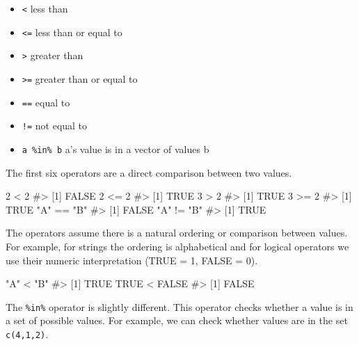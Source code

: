 \documentclass[
  letterpaper,
]{latex/krantz}
\makeatletter
\newenvironment{Shaded}{\begin{snugshade}}{\end{snugshade}}
\newcommand{\CommentTok}[1]{\textcolor[rgb]{0.37,0.37,0.37}{#1}}
\newcommand{\ConstantTok}[1]{\textcolor[rgb]{0.56,0.35,0.01}{#1}}
\newcommand{\DecValTok}[1]{\textcolor[rgb]{0.68,0.00,0.00}{#1}}
\newcommand{\SpecialCharTok}[1]{\textcolor[rgb]{0.37,0.37,0.37}{#1}}
\newcommand{\StringTok}[1]{\textcolor[rgb]{0.13,0.47,0.30}{#1}}
\providecommand{\tightlist}{%
  \setlength{\itemsep}{0pt}\setlength{\parskip}{0pt}}\usepackage{longtable,booktabs,array}
\newenvironment{kframe}{%
\medskip{}
\setlength{\fboxsep}{.8em}
 \def\at@end@of@kframe{}%
 \ifinner\ifhmode%
  \def\at@end@of@kframe{\end{minipage}}%
  \begin{minipage}{\columnwidth}%
 \fi\fi%
 \def\FrameCommand##1{\hskip\@totalleftmargin \hskip-\fboxsep
 \colorbox{shadecolor}{##1}\hskip-\fboxsep
     \hskip-\linewidth \hskip-\@totalleftmargin \hskip\columnwidth}%
 \MakeFramed {\advance\hsize-\width
   \@totalleftmargin\z@ \linewidth\hsize
   \@setminipage}}%
 {\par\unskip\endMakeFramed%
 \at@end@of@kframe}
\renewenvironment{Shaded}{\begin{kframe}}{\end{kframe}}
\makeatother
\begin{document}
\begin{itemize}
\tightlist
\item
  \texttt{\textless{}} less than
\item
  \texttt{\textless{}=} less than or equal to
\item
  \texttt{\textgreater{}} greater than
\item
  \texttt{\textgreater{}=} greater than or equal to
\item
  \texttt{==} equal to
\item
  \texttt{!=} not equal to
\item
  \texttt{a\ \%in\%\ b} a's value is in a vector of values b
\end{itemize}

The first six operators are a direct comparison between two values.

\begin{Shaded}
\begin{Highlighting}[]
\DecValTok{2} \SpecialCharTok{\textless{}} \DecValTok{2}
\CommentTok{\#\textgreater{} [1] FALSE}
\DecValTok{2} \SpecialCharTok{\textless{}=} \DecValTok{2}
\CommentTok{\#\textgreater{} [1] TRUE}
\DecValTok{3} \SpecialCharTok{\textgreater{}} \DecValTok{2}
\CommentTok{\#\textgreater{} [1] TRUE}
\DecValTok{3} \SpecialCharTok{\textgreater{}=} \DecValTok{2}
\CommentTok{\#\textgreater{} [1] TRUE}
\StringTok{"A"} \SpecialCharTok{==} \StringTok{"B"}
\CommentTok{\#\textgreater{} [1] FALSE}
\StringTok{"A"} \SpecialCharTok{!=} \StringTok{"B"}
\CommentTok{\#\textgreater{} [1] TRUE}
\end{Highlighting}
\end{Shaded}

The operators assume there is a natural ordering or comparison between
values. For example, for strings the ordering is alphabetical and for
logical operators we use their numeric interpretation (TRUE = 1, FALSE =
0).

\begin{Shaded}
\begin{Highlighting}[]
\StringTok{"A"} \SpecialCharTok{\textless{}} \StringTok{"B"}
\CommentTok{\#\textgreater{} [1] TRUE}
\ConstantTok{TRUE} \SpecialCharTok{\textless{}} \ConstantTok{FALSE}
\CommentTok{\#\textgreater{} [1] FALSE}
\end{Highlighting}
\end{Shaded}

The \texttt{\%in\%} operator is slightly different. This operator checks
whether a value is in a set of possible values. For example, we can
check whether values are in the set \texttt{c(4,1,2)}.
\end{document}
